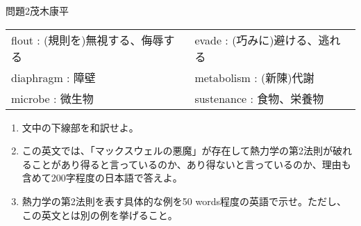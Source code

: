 \documentclass[fleqn]{jbook}
\begin{document}
\begin{question}{問題2}{茂木康平}
\begin{table}[h]
    \hspace{8mm}
    \begin{tabular}{ll}
	flout :  (規則を)無視する、侮辱する & evade : (巧みに)避ける、逃れる \\
	diaphragm : 障壁 & metabolism : (新陳)代謝 \\
	microbe : 微生物 & sustenance : 食物、栄養物
    \end{tabular}
\end{table}

\begin{enumerate}
    \item 文中の下線部を和訳せよ。

    \item この英文では、「マックスウェルの悪魔」が存在して熱力学の第2法則が破れることがあり得ると言っているのか、あり得ないと言っているのか、理由も含めて200字程度の日本語で答えよ。

    \item 熱力学の第2法則を表す具体的な例を50 words程度の英語で示せ。ただし、この英文とは別の例を挙げること。
\end{enumerate}

\end{question}

\end{document}
